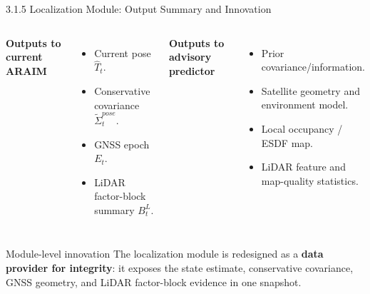 \documentclass[10pt,aspectratio=169,xcolor=dvipsnames]{beamer}
\newcommand{\innov}[1]{\textcolor{NavyBlue}{\textbf{#1}}}
\begin{document}
\begin{frame}{3.1.5 Localization Module: Output Summary and Innovation}
  \small
  \begin{columns}[T]
    \textbf{Outputs to current ARAIM}
    \begin{itemize}\footnotesize
      \item Current pose $\hat{T}_t$.
      \item Conservative covariance $\tilde{\Sigma}^{pose}_t$.
      \item GNSS epoch $E_t$.
      \item LiDAR factor-block summary $B^L_t$.
    \end{itemize}

    \textbf{Outputs to advisory predictor}
    \begin{itemize}\footnotesize
      \item Prior covariance/information.
      \item Satellite geometry and environment model.
      \item Local occupancy / ESDF map.
      \item LiDAR feature and map-quality statistics.
    \end{itemize}
  \end{columns}

  \vspace{5pt}
  \begin{block}{Module-level innovation}
    \footnotesize The localization module is redesigned as a \innov{data provider for integrity}: it exposes the state estimate, conservative covariance, GNSS geometry, and LiDAR factor-block evidence in one snapshot.
  \end{block}
\end{frame}

\end{document}
